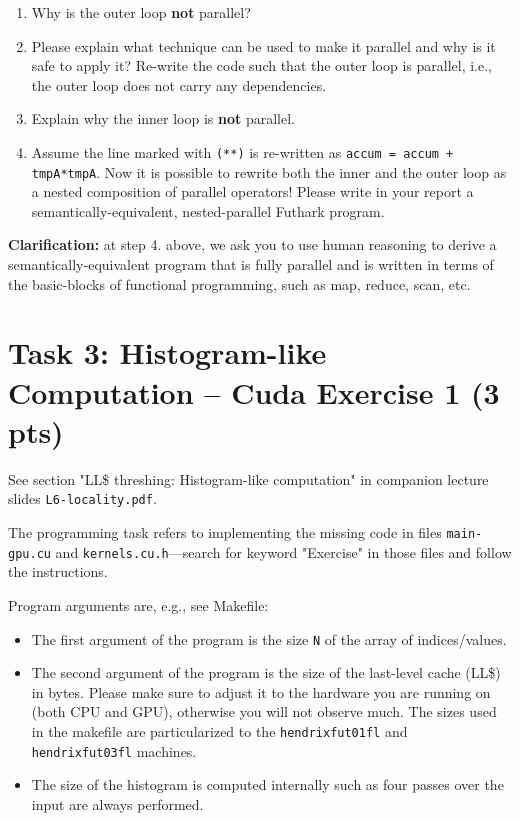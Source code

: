 \documentclass{article}
\begin{document}
\begin{itemize}
\begin{enumerate}
    \item Why is the outer loop \textbf{not} parallel? 
    \item Please explain what technique can be used to make it parallel and why is it safe to apply it?
  Re-write the code such that the outer loop is parallel, 
        i.e., the outer loop does not carry any dependencies.
    \item Explain why the inner loop is \textbf{not} parallel.
    \item Assume the line marked with \texttt{(**)} is re-written as \texttt{accum = accum + tmpA*tmpA}.
  Now it is possible to rewrite both the inner and the outer loop as a nested 
    composition of parallel operators! Please write in your report a 
    semantically-equivalent, nested-parallel Futhark program.
\end{enumerate}

\textbf{Clarification:} at step 4. above, we ask you to use human reasoning to
derive a semantically-equivalent program that is fully parallel and is written
in terms of the basic-blocks of functional programming, such as map, reduce, scan, etc. 

\section{Task 3: Histogram-like Computation -- Cuda Exercise 1 (3 pts)}

See section "LL\$ threshing: Histogram-like computation" in companion lecture slides \texttt{L6-locality.pdf}.

The programming task refers to implementing the missing code in files \texttt{main-gpu.cu} and \texttt{kernels.cu.h}---search for keyword "Exercise" in those files and follow the instructions.

Program arguments are, e.g., see Makefile:

\begin{itemize}
    \item The first argument of the program is the size \texttt{N} of the array of indices/values. 
    \item The second argument of the program is the size of the last-level cache (LL\$) in bytes. Please make sure to adjust it to the hardware you are running on (both CPU and GPU), otherwise you will not observe much. The sizes used in the makefile are particularized to the \texttt{hendrixfut01fl} and \texttt{hendrixfut03fl} machines.
    \item The size of the histogram is computed internally such as four passes over the input are always performed.
\end{itemize}


\end{itemize}
\end{document}
